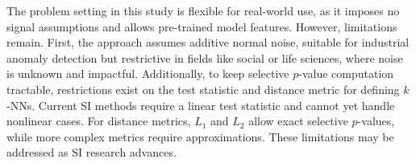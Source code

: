 The problem setting in this study is flexible for real-world use, as it imposes no signal assumptions and allows pre-trained model features.
%
However, limitations remain.
%
First, the approach assumes additive normal noise, suitable for industrial anomaly detection but restrictive in fields like social or life sciences, where noise is unknown and impactful.
%
Additionally, to keep selective $p$-value computation tractable, restrictions exist on the test statistic and distance metric for defining $k$-NNs.
%
Current SI methods require a linear test statistic and cannot yet handle nonlinear cases.
%
For distance metrics, $L_1$ and $L_2$ allow exact selective $p$-values, while more complex metrics require approximations.
%
These limitations may be addressed as SI research advances.